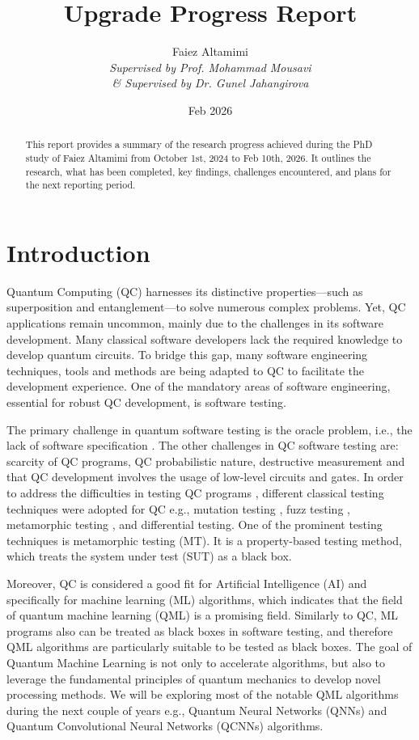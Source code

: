 \documentclass[12pt,a4paper]{article}
\title{Upgrade Progress Report}
\author{Faiez Altamimi
	\\ \textit{Supervised by Prof. Mohammad Mousavi}
	\\ \textit{\& Supervised by Dr. Gunel Jahangirova}
}
\date{Feb 2026}
\begin{document}
	
	\maketitle 
	
	\begin{abstract}
		This report provides a summary of the research progress achieved during the PhD study of Faiez Altamimi from October 1st, 2024 to Feb 10th, 2026. It outlines the research, what has been completed, key findings, challenges encountered, and plans for the next reporting period.
	\end{abstract}
	
	\tableofcontents 
	\newpage 
	
	\section{Introduction}
	\label{sec:introduction}
	
	Quantum Computing (QC) harnesses its distinctive properties—such as superposition and entanglement—to solve numerous complex problems. Yet, QC applications remain uncommon, mainly due to the challenges in its software development. Many classical software developers lack the required knowledge to develop quantum circuits. To bridge this gap, many software engineering techniques, tools and methods are being adapted to QC to facilitate the development experience. One of the mandatory areas of software engineering, essential for robust QC development, is software testing.
	
	The primary challenge in quantum software testing is the oracle problem, i.e., the lack of software specification \cite{9036058}. The other challenges in QC software testing are: scarcity of QC programs, QC probabilistic nature, destructive measurement \cite{wang2023qucatcombinatorialtestingtool} and that QC development involves the usage of low-level circuits and gates. In order to address the difficulties in testing QC programs \cite{garousi2020software}, different classical testing techniques were adopted for QC e.g., mutation testing \cite{9844849}, fuzz testing \cite{wang2018quanfuzzfuzztestingquantum}, metamorphic testing \cite{10.1145/3528230.352918}, and differential testing. One of the prominent testing techniques is metamorphic testing (MT). It is a property-based testing method, which treats the system under test (SUT) as a black box. 
	
	Moreover, QC is considered a good fit for Artificial Intelligence (AI) and specifically for machine learning (ML) algorithms, which indicates that the field of quantum machine learning (QML) is a promising field. Similarly to QC, ML programs also can be treated as black boxes in software testing, and therefore QML algorithms are particularly suitable to be tested as black boxes. The goal of Quantum Machine Learning is not only to accelerate algorithms, but also to leverage the fundamental principles of quantum mechanics to develop novel processing methods. We will be exploring most of the notable QML algorithms during the next couple of years e.g., Quantum Neural Networks (QNNs) and Quantum Convolutional Neural Networks (QCNNs) algorithms.
	
\end{document}
